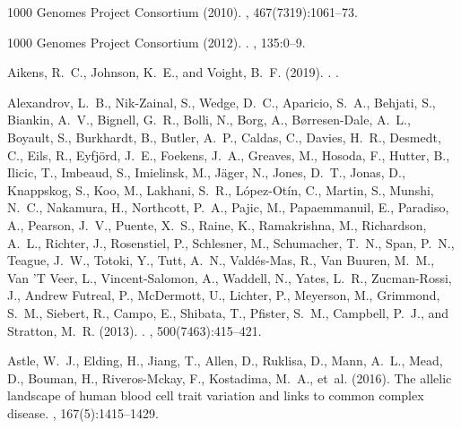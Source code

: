 \documentclass[9pt,article]{template}
\begin{document}
%
\begin{thebibliography}{}

{1000 Genomes Project Consortium} (2010).
, 467(7319):1061--73.

{1000 Genomes Project Consortium} (2012).
.
, 135:0--9.

Aikens, R.~C., Johnson, K.~E., and Voight, B.~F. (2019).
.
.

Alexandrov, L.~B., Nik-Zainal, S., Wedge, D.~C., Aparicio, S.~A., Behjati, S.,
  Biankin, A.~V., Bignell, G.~R., Bolli, N., Borg, A., B{\o}rresen-Dale, A.~L.,
  Boyault, S., Burkhardt, B., Butler, A.~P., Caldas, C., Davies, H.~R.,
  Desmedt, C., Eils, R., Eyfj{\"{o}}rd, J.~E., Foekens, J.~A., Greaves, M.,
  Hosoda, F., Hutter, B., Ilicic, T., Imbeaud, S., Imielinsk, M., J{\"{a}}ger,
  N., Jones, D.~T., Jonas, D., Knappskog, S., Koo, M., Lakhani, S.~R.,
  L{\'{o}}pez-Ot{\'{i}}n, C., Martin, S., Munshi, N.~C., Nakamura, H.,
  Northcott, P.~A., Pajic, M., Papaemmanuil, E., Paradiso, A., Pearson, J.~V.,
  Puente, X.~S., Raine, K., Ramakrishna, M., Richardson, A.~L., Richter, J.,
  Rosenstiel, P., Schlesner, M., Schumacher, T.~N., Span, P.~N., Teague, J.~W.,
  Totoki, Y., Tutt, A.~N., Vald{\'{e}}s-Mas, R., {Van Buuren}, M.~M., {Van 'T
  Veer}, L., Vincent-Salomon, A., Waddell, N., Yates, L.~R., Zucman-Rossi, J.,
  {Andrew Futreal}, P., McDermott, U., Lichter, P., Meyerson, M., Grimmond,
  S.~M., Siebert, R., Campo, E., Shibata, T., Pfister, S.~M., Campbell, P.~J.,
  and Stratton, M.~R. (2013).
.
, 500(7463):415--421.

Astle, W.~J., Elding, H., Jiang, T., Allen, D., Ruklisa, D., Mann, A.~L., Mead,
  D., Bouman, H., Riveros-Mckay, F., Kostadima, M.~A., et~al. (2016).
\newblock The allelic landscape of human blood cell trait variation and links
  to common complex disease.
, 167(5):1415--1429.


\end{thebibliography}
\end{document}
